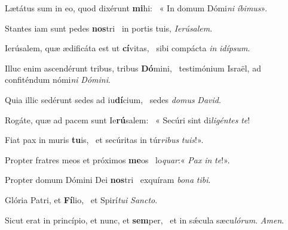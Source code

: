 \item Lætátus sum in eo, quod dixérunt \textbf{mi}hi:~\psstar{} « In domum Dómi\textit{ni} \textit{íbimus}».

\item Stantes iam sunt pedes \textbf{nos}tri~\psstar{} in portis tuis, \textit{Ierúsalem}.

\item Ierúsalem, quæ ædificáta est ut \textbf{cí}vitas,~\psstar{} sibi compácta \textit{in} \textit{idípsum}.

\item Illuc enim ascendérunt tribus, tribus \textbf{Dó}mini,~\psstar{} testimónium Israël, ad confiténdum nómi\textit{ni} \textit{Dómini}.

\item Quia illic sedérunt sedes ad iu\textbf{dí}cium,~\psstar{} sedes \textit{domus} \textit{David}.

\item Rogáte, quæ ad pacem sunt Ie\textbf{rú}salem:~\psstar{} « Secúri sint di\textit{ligéntes} \textit{te}!

\item Fiat pax in muris \textbf{tu}is,~\psstar{} et secúritas in túr\textit{ribus} \textit{tuis}!».

\item Propter fratres meos et próximos \textbf{me}os~\psstar{} lo\textit{quar}:« \textit{Pax} \textit{in} \textit{te}!».

\item Propter domum Dómini Dei \textbf{nos}tri~\psstar{} exquíram \textit{bona} \textit{tibi}.

\item Glória Patri, et \textbf{Fí}lio,~\psstar{} et Spirí\textit{tui} \textit{Sancto}.

\item Sicut erat in princípio, et nunc, et \textbf{sem}per,~\psstar{} et in sǽcula sæcu\textit{lórum}. \textit{Amen}.